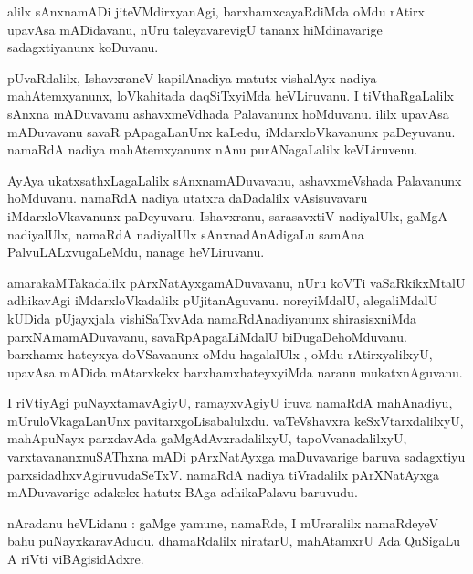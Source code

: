 \documentclass{article}
\begin{document}
\begin{mn}
alilx sAnxnamADi jiteVMdirxyanAgi, barxhamxcayaRdiMda oMdu rAtirx upavAsa mADidavanu, nUru 
taleyavarevigU tananx hiMdinavarige sadagxtiyanunx koDuvanu.
\end{mn}

\begin{mn}
pUvaRdalilx, IshavxraneV kapilAnadiya matutx vishalAyx nadiya mahAtemxyanunx, loVkahitada 
daqSiTxyiMda heVLiruvanu. I tiVthaRgaLalilx sAnxna mADuvavanu ashavxmeVdhada Palavanunx hoMduvanu. 
ililx upavAsa mADuvavanu savaR pApagaLanUnx kaLedu, iMdarxloVkavanunx paDeyuvanu. namaRdA nadiya
mahAtemxyanunx nAnu purANagaLalilx keVLiruvenu.
\end{mn}

\begin{mn}
AyAya ukatxsathxLagaLalilx sAnxnamADuvavanu, ashavxmeVshada Palavanunx hoMduvanu. 
namaRdA nadiya utatxra daDadalilx vAsisuvavaru iMdarxloVkavanunx paDeyuvaru. Ishavxranu, 
sarasavxtiV nadiyalUlx, gaMgA nadiyalUlx, namaRdA nadiyalUlx sAnxnadAnAdigaLu samAna 
PalvuLALxvugaLeMdu, nanage heVLiruvanu.
\end{mn}

\begin{mn}
amarakaMTakadalilx pArxNatAyxgamADuvavanu, nUru koVTi vaSaRkikxMtalU adhikavAgi iMdarxloVkadalilx
pUjitanAguvanu. noreyiMdalU, alegaliMdalU kUDida pUjayxjala vishiSaTxvAda namaRdAnadiyanunx 
shirasisxniMda parxNAmamADuvavanu, savaRpApagaLiMdalU biDugaDehoMduvanu. barxhamx hateyxya
doVSavanunx oMdu hagalalUlx , oMdu rAtirxyalilxyU, upavAsa mADida mAtarxkekx barxhamxhateyxyiMda 
naranu mukatxnAguvanu.
\end{mn}

\begin{mn}
I riVtiyAgi puNayxtamavAgiyU, ramayxvAgiyU iruva namaRdA mahAnadiyu, mUruloVkagaLanUnx 
pavitarxgoLisabalulxdu. vaTeVshavxra keSxVtarxdalilxyU, mahApuNayx parxdavAda gaMgAdAvxradalilxyU,
tapoVvanadalilxyU, varxtavananxnuSAThxna mADi pArxNatAyxga maDuvavarige baruva sadagxtiyu
parxsidadhxvAgiruvudaSeTxV. namaRdA nadiya tiVradalilx pArXNatAyxga mADuvavarige adakekx hatutx BAga
adhikaPalavu baruvudu.
\end{mn}


\begin{mn}
nAradanu heVLidanu : gaMge yamune, namaRde, I mUraralilx  namaRdeyeV bahu puNayxkaravAdudu.
dhamaRdalilx niratarU, mahAtamxrU Ada QuSigaLu A riVti viBAgisidAdxre.
\end{mn}
\end{document}
